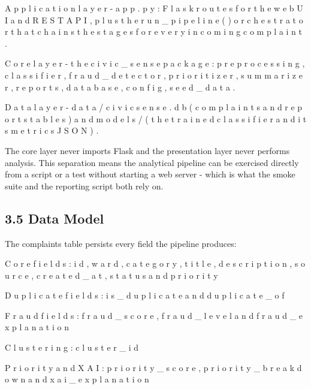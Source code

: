 \documentclass[10pt,letterpaper,oneside]{article}\usepackage{geometry}\geometry{top=1in,bottom=1in,left=1in,right=1in,includeheadfoot}\usepackage{xcolor}\definecolor{color@navy}{HTML}{1F3B63}\definecolor{color@grey}{HTML}{404040}\definecolor{color@hdr}{HTML}{F2F4F7}\usepackage{titlesec}\titleformat{\section}  {\normalfont\huge\bfseries\color@navy}  {}{0pt}{\MakeUppercase}\titleformat{\subsection}  {\normalfont\Large\bfseries\color@navy}  {}{0pt}{}\titleformat{\subsubsection}  {\normalfont\large\bfseries\color@navy}  {}{0pt}{}\titlespacing*{\section}{0pt}{14pt}{6pt}\titlespacing*{\subsection}{0pt}{10pt}{4pt}\titlespacing*{\subsubsection}{0pt}{8pt}{3pt}\setlength{\parindent}{0pt}\setlength{\parskip}{0.6em}\parindent=0pt\usepackage{enumitem}\setlist{nosep,leftmargin=*,itemsep=0pt,topsep=2pt,partopsep=0pt}\usepackage{array}\usepackage{booktabs}\usepackage{caption}\captionsetup{font={small,it},labelfont={bf},labelsep=period,  parskip=2pt,skip=4pt,list=no}\captionsetup[table]{labelfont={bf,small,color@navy},name=Table}\usepackage{graphicx}\usepackage{verbatim}\usepackage{ragged2e}\usepackage{longtable}\usepackage{tabularx}\usepackage{multirow}\usepackage{colortbl}\definecolor{rowshade}{HTML}{F2F4F7}\usepackage{tikz}\usetikzlibrary{positioning,calc}\usepackage[hidelinks]{hyperref}\hypersetup{colorlinks=true,linkcolor=color@navy,urlcolor=color@navy}\pagestyle{fancy}\fancyhf{}\renewcommand{\headrulewidth}{0.4pt}\fancyhead[L]{\small\color@navy CivicSense — Project Report}\fancyhead[R]{\small\color@grey October 11, 2026}\fancyfoot[C]{\small\color@grey An Integrated Intelligent Triage Pipelin}\fancyfoot[R]{\small\color@grey Page \thepage}\usepackage{setspace}\setstretch{1.15}\AtBeginDocument{  \hypersetup{pdftitle={An Integrated Intelligent Triage Pipeline for AI-Enhanced Citizen Complaint Management},    pdfauthor={CivicSense Project Team},    pdfsubject={Project Report},    pdfkeywords={smart cities, NLP, complaint management, e-governance},    pdfcreator={CivicSense Project Team}  }}
\begin{document}
\item A p p l i c a t i o n   l a y e r   -   a p p . p y :   F l a s k   r o u t e s   f o r   t h e   w e b   U I   a n d   R E S T   A P I ,   p l u s   t h e   r u n \_ p i p e l i n e ( )   o r c h e s t r a t o r   t h a t   c h a i n s   t h e   s t a g e s   f o r   e v e r y   i n c o m i n g   c o m p l a i n t .

\item C o r e   l a y e r   -   t h e   c i v i c \_ s e n s e   p a c k a g e :   p r e p r o c e s s i n g ,   c l a s s i f i e r ,   f r a u d \_ d e t e c t o r ,   p r i o r i t i z e r ,   s u m m a r i z e r ,   r e p o r t s ,   d a t a b a s e ,   c o n f i g ,   s e e d \_ d a t a .

\item D a t a   l a y e r   -   d a t a / c i v i c s e n s e . d b   ( c o m p l a i n t s   a n d   r e p o r t s   t a b l e s )   a n d   m o d e l s /   ( t h e   t r a i n e d   c l a s s i f i e r   a n d   i t s   m e t r i c s   J S O N ) .

The core layer never imports Flask and the presentation layer never performs analysis. This separation means the analytical pipeline can be exercised directly from a script or a test without starting a web server - which is what the smoke suite and the reporting script both rely on.

\subsection*{3.5 Data Model}
The complaints table persists every field the pipeline produces:

\item C o r e   f i e l d s :   i d ,   w a r d ,   c a t e g o r y ,   t i t l e ,   d e s c r i p t i o n ,   s o u r c e ,   c r e a t e d \_ a t ,   s t a t u s   a n d   p r i o r i t y

\item D u p l i c a t e   f i e l d s :   i s \_ d u p l i c a t e   a n d   d u p l i c a t e \_ o f

\item F r a u d   f i e l d s :   f r a u d \_ s c o r e ,   f r a u d \_ l e v e l   a n d   f r a u d \_ e x p l a n a t i o n

\item C l u s t e r i n g :   c l u s t e r \_ i d

\item P r i o r i t y   a n d   X A I :   p r i o r i t y \_ s c o r e ,   p r i o r i t y \_ b r e a k d o w n   a n d   x a i \_ e x p l a n a t i o n
\end{document}
